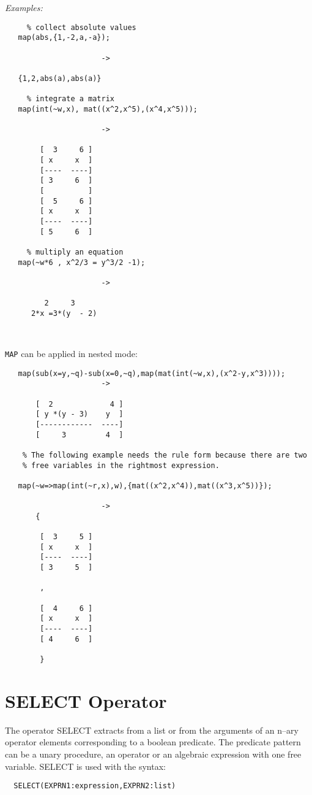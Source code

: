 {\it Examples:}
\begin{verbatim}
     % collect absolute values
   map(abs,{1,-2,a,-a});
               
                      ->

   {1,2,abs(a),abs(a)}

     % integrate a matrix
   map(int(~w,x), mat((x^2,x^5),(x^4,x^5)));

                      ->
 
        [  3     6 ]
        [ x     x  ]
        [----  ----]
        [ 3     6  ]
        [          ]
        [  5     6 ]
        [ x     x  ]
        [----  ----]
        [ 5     6  ]

     % multiply an equation
   map(~w*6 , x^2/3 = y^3/2 -1);
   
                      ->

         2     3
      2*x =3*(y  - 2)

    
\end{verbatim}
{\tt MAP} can be applied in nested mode:
\begin{verbatim}
   map(sub(x=y,~q)-sub(x=0,~q),map(mat(int(~w,x),(x^2-y,x^3))));
                      ->

       [  2             4 ]
       [ y *(y - 3)    y  ]
       [------------  ----]
       [     3         4  ]

    % The following example needs the rule form because there are two
    % free variables in the rightmost expression.
 
   map(~w=>map(int(~r,x),w),{mat((x^2,x^4)),mat((x^3,x^5))});

                      ->
       {

        [  3     5 ]
        [ x     x  ] 
        [----  ----]
        [ 3     5  ]

        ,

        [  4     6 ]
        [ x     x  ]
        [----  ----]
        [ 4     6  ]

        }
\end{verbatim}



\section{SELECT Operator}
The operator SELECT extracts from a list 
or from the arguments of an n--ary operator elements corresponding
to a boolean predicate. The predicate pattern can be a
unary procedure, an operator or an algebraic expression with
one free variable. SELECT is used with the syntax:
\begin{verbatim}
  SELECT(EXPRN1:expression,EXPRN2:list)
\end{verbatim}

